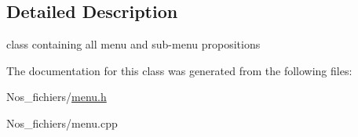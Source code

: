 \subsection{Detailed Description}
class containing all menu and sub-\/menu propositions 

The documentation for this class was generated from the following files\+:\begin{DoxyCompactItemize}
\item 
Nos\+\_\+fichiers/\hyperlink{menu_8h}{menu.\+h}\item 
Nos\+\_\+fichiers/menu.\+cpp\end{DoxyCompactItemize}

